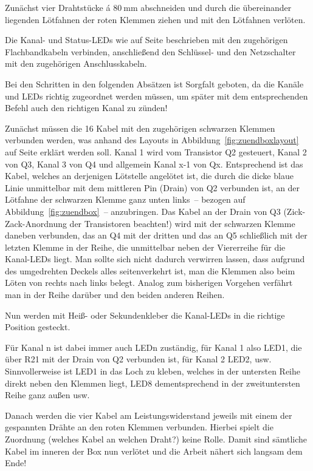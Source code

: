 \documentclass[paper=a4, parskip, numbers=noenddot, toc=listof, headsepline]{scrbook}
\begin{document}
			  Zunächst vier Drahtstücke á $\SI{80}{\milli\metre}$ abschneiden und durch die übereinander liegenden Lötfahnen der roten Klemmen ziehen und mit den Lötfahnen verlöten.

			  Die Kanal- und Status-LEDs wie auf Seite \pageref{enum:leds} beschrieben mit den zugehörigen Flachbandkabeln verbinden, anschließend den Schlüssel- und den Netzschalter mit den zugehörigen Anschlusskabeln.

			  Bei den Schritten in den folgenden Absätzen ist Sorgfalt geboten, da die Kanäle und LEDs richtig zugeordnet werden müssen, um später mit dem entsprechenden Befehl auch den richtigen Kanal zu zünden!

			  Zunächst müssen die 16 Kabel mit den zugehörigen schwarzen Klemmen verbunden werden, was anhand des Layouts in Abbildung~\ref{fig:zuendboxlayout} auf Seite \pageref{fig:zuendboxlayout} erklärt werden soll. Kanal 1 wird vom Transistor Q2 gesteuert, Kanal 2 von Q3, Kanal 3 von Q4 und allgemein Kanal x-1 von Qx. Entsprechend ist das Kabel, welches an derjenigen Lötstelle angelötet ist, die durch die dicke blaue Linie unmittelbar mit dem mittleren Pin (Drain) von Q2 verbunden ist, an der Lötfahne der schwarzen Klemme ganz unten links~-- bezogen auf Abbildung~\ref{fig:zuendbox}~-- anzubringen. Das Kabel an der Drain von Q3 (Zick-Zack-Anordnung der Transistoren beachten!) wird mit der schwarzen Klemme daneben verbunden, das an Q4 mit der dritten und das an Q5 schließlich mit der letzten Klemme in der Reihe, die unmittelbar neben der Viererreihe für die Kanal-LEDs liegt. Man sollte sich nicht dadurch verwirren lassen, dass aufgrund des umgedrehten Deckels alles seitenverkehrt ist, man die Klemmen also beim Löten von rechts nach links belegt. Analog zum bisherigen Vorgehen verfährt man in der Reihe darüber und den beiden anderen Reihen.

			  Nun werden mit Heiß- oder Sekundenkleber die Kanal-LEDs in die richtige Position gesteckt.

			  Für Kanal n ist dabei immer auch LEDn zuständig, für Kanal 1 also LED1, die über R21 mit der Drain von Q2 verbunden ist, für Kanal 2 LED2, usw. Sinnvollerweise ist LED1 in das Loch zu kleben, welches in der untersten Reihe direkt neben den Klemmen liegt, LED8 dementsprechend in der zweituntersten Reihe ganz außen usw.

			  Danach werden die vier Kabel am Leistungswiderstand jeweils mit einem der gespannten Drähte an den roten Klemmen verbunden. Hierbei spielt die Zuordnung (welches Kabel an welchen Draht?) keine Rolle. Damit sind sämtliche Kabel im inneren der Box nun verlötet und die Arbeit nähert sich langsam dem Ende!
\end{document}
